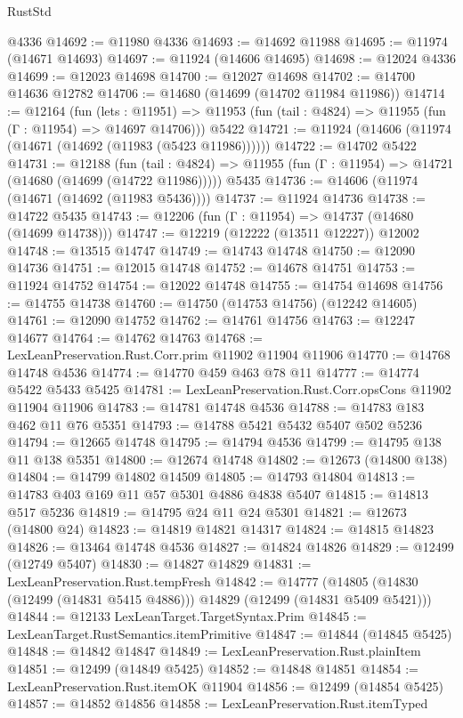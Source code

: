 \begin{lexlean}{RustStd}
\begin{coremodule}
    @4336
@14692 := @11980 @4336
@14693 := @14692 @11988
@14695 := @11974 (@14671 @14693)
@14697 := @11924 (@14606 @14695)
@14698 := @12024 @4336
@14699 := @12023 @14698
@14700 := @12027 @14698
@14702 := @14700 @14636 @12782
@14706 := @14680 (@14699 (@14702 @11984 @11986))
@14714 := @12164
    (fun (lets : @11951) =>
    @11953 (fun (tail : @4824) => @11955 (fun (Γ : @11954) => @14697 @14706)))
    @5422
@14721 := @11924 (@14606 (@11974 (@14671 (@14692 (@11983 (@5423 @11986))))))
@14722 := @14702 @5422
@14731 := @12188
    (fun (tail : @4824) => @11955 (fun (Γ : @11954) => @14721 (@14680 (@14699 (@14722 @11986)))))
    @5435
@14736 := @14606 (@11974 (@14671 (@14692 (@11983 @5436))))
@14737 := @11924 @14736
@14738 := @14722 @5435
@14743 := @12206 (fun (Γ : @11954) => @14737 (@14680 (@14699 @14738)))
@14747 := @12219 (@12222 (@13511 @12227)) @12002
@14748 := @13515 @14747
@14749 := @14743 @14748
@14750 := @12090 @14736
@14751 := @12015 @14748
@14752 := @14678 @14751
@14753 := @11924 @14752
@14754 := @12022 @14748
@14755 := @14754 @14698
@14756 := @14755 @14738
@14760 := @14750 (@14753 @14756) (@12242 @14605)
@14761 := @12090 @14752
@14762 := @14761 @14756
@14763 := @12247 @14677
@14764 := @14762 @14763
@14768 := LexLeanPreservation.Rust.Corr.prim @11902 @11904 @11906
@14770 := @14768 @14748 @4536
@14774 := @14770 @459 @463 @78 @11
@14777 := @14774 @5422 @5433 @5425
@14781 := LexLeanPreservation.Rust.Corr.opsCons @11902 @11904 @11906
@14783 := @14781 @14748 @4536
@14788 := @14783 @183 @462 @11 @76 @5351
@14793 := @14788 @5421 @5432 @5407 @502 @5236
@14794 := @12665 @14748
@14795 := @14794 @4536
@14799 := @14795 @138 @11 @138 @5351
@14800 := @12674 @14748
@14802 := @12673 (@14800 @138)
@14804 := @14799 @14802 @14509
@14805 := @14793 @14804
@14813 := @14783 @403 @169 @11 @57 @5301 @4886 @4838 @5407
@14815 := @14813 @517 @5236
@14819 := @14795 @24 @11 @24 @5301
@14821 := @12673 (@14800 @24)
@14823 := @14819 @14821 @14317
@14824 := @14815 @14823
@14826 := @13464 @14748 @4536
@14827 := @14824 @14826
@14829 := @12499 (@12749 @5407)
@14830 := @14827 @14829
@14831 := LexLeanPreservation.Rust.tempFresh
@14842 := @14777
    (@14805 (@14830 (@12499 (@14831 @5415 @4886))) @14829 (@12499 (@14831 @5409 @5421)))
@14844 := @12133 LexLeanTarget.TargetSyntax.Prim
@14845 := LexLeanTarget.RustSemantics.itemPrimitive
@14847 := @14844 (@14845 @5425)
@14848 := @14842 @14847
@14849 := LexLeanPreservation.Rust.plainItem
@14851 := @12499 (@14849 @5425)
@14852 := @14848 @14851
@14854 := LexLeanPreservation.Rust.itemOK @11904
@14856 := @12499 (@14854 @5425)
@14857 := @14852 @14856
@14858 := LexLeanPreservation.Rust.itemTyped

\end{coremodule}
\end{lexlean}
